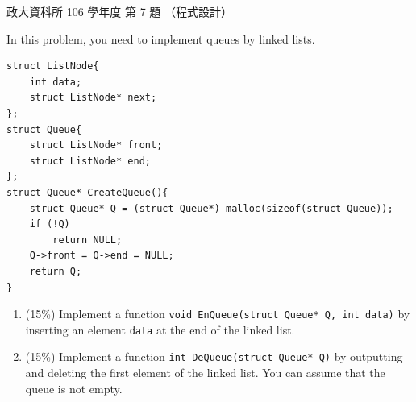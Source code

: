 \begin{pastexam}[label={px:nccu-106-dsa-07}]{政大資科所 106 學年度 第 7 題}
（程式設計）

In this problem, you need to implement queues by linked lists.
\begin{verbatim}
struct ListNode{
    int data;
    struct ListNode* next;
};
struct Queue{
    struct ListNode* front;
    struct ListNode* end;
};
struct Queue* CreateQueue(){
    struct Queue* Q = (struct Queue*) malloc(sizeof(struct Queue));
    if (!Q)
        return NULL;
    Q->front = Q->end = NULL;
    return Q;
}
\end{verbatim}
\begin{enumerate}[label=\Alph*.]
\item (15\%) Implement a function \texttt{void EnQueue(struct Queue* Q, int data)} by inserting an
element \texttt{data} at the end of the linked list.
\item (15\%) Implement a function \texttt{int DeQueue(struct Queue* Q)} by outputting and deleting
the first element of the linked list. You can assume that the queue is not empty.
\end{enumerate}
\end{pastexam}

